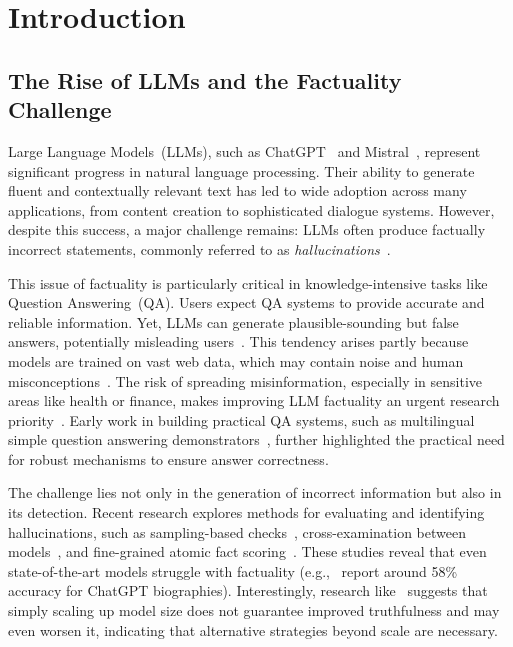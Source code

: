 \chapter{Introduction}
\label{chap:introduction}

\section{The Rise of LLMs and the Factuality Challenge}
\label{sec:intro_factuality_challenge}

Large Language Models~(LLMs), such as ChatGPT~\cite{DBLP:conf/nips/Ouyang0JAWMZASR22} and Mistral~\cite{DBLP:journals/corr/abs-2310-06825-mistral}, represent significant progress in natural language processing. Their ability to generate fluent and contextually relevant text has led to wide adoption across many applications, from content creation to sophisticated dialogue systems. However, despite this success, a major challenge remains: LLMs often produce factually incorrect statements, commonly referred to as \textit{hallucinations}~\cite{DBLP:journals/natmi/AugensteinBCCCCDFHHHJMM24}.

This issue of factuality is particularly critical in knowledge-intensive tasks like Question Answering~(QA). Users expect QA systems to provide accurate and reliable information. Yet, LLMs can generate plausible-sounding but false answers, potentially misleading users~\cite{lin-etal-2022-truthfulqa}. This tendency arises partly because models are trained on vast web data, which may contain noise and human misconceptions~\cite{lin-etal-2022-truthfulqa}. The risk of spreading misinformation, especially in sensitive areas like health or finance, makes improving LLM factuality an urgent research priority~\cite{DBLP:journals/natmi/AugensteinBCCCCDFHHHJMM24}. Early work in building practical QA systems, such as multilingual simple question answering demonstrators~\cite{DBLP:conf/acl/RazzhigaevSMBP23}, further highlighted the practical need for robust mechanisms to ensure answer correctness.

The challenge lies not only in the generation of incorrect information but also in its detection. Recent research explores methods for evaluating and identifying hallucinations, such as sampling-based checks~\cite{manakul-etal-2023-selfcheckgpt}, cross-examination between models~\cite{cohen-etal-2023-lm}, and fine-grained atomic fact scoring~\cite{min-etal-2023-factscore}. These studies reveal that even state-of-the-art models struggle with factuality (e.g.,~\cite{min-etal-2023-factscore} report around 58\% accuracy for ChatGPT biographies). Interestingly, research like~\cite{lin-etal-2022-truthfulqa} suggests that simply scaling up model size does not guarantee improved truthfulness and may even worsen it, indicating that alternative strategies beyond scale are necessary.

